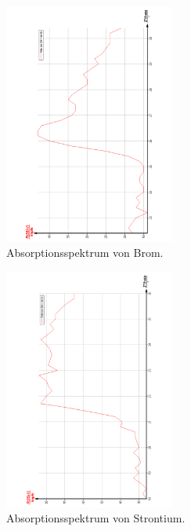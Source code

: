 \begin{figure}
  \centering
  \includegraphics[width=0.5\textwidth, angle=270]{bilder/AbsorpBr.pdf}
  \caption{Absorptionsspektrum von Brom.}
  \label{fig:Brom}
\end{figure}
\begin{figure}
  \centering
  \includegraphics[width=0.5\textwidth, angle=270]{bilder/AbsorpSr.pdf}
  \caption{Absorptionsspektrum von Strontium.}
  \label{fig:Strontium}
\end{figure}

